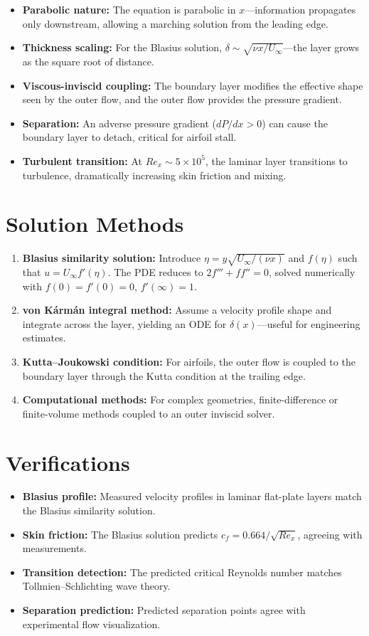 \documentclass[11pt,openright]{book}
\begin{document}
\begin{itemize}
\item \textbf{Parabolic nature:} The equation is parabolic in $x$---information propagates only downstream, allowing a marching solution from the leading edge.
\item \textbf{Thickness scaling:} For the Blasius solution, $\delta \sim \sqrt{\nu x / U_\infty}$---the layer grows as the square root of distance.
\item \textbf{Viscous-inviscid coupling:} The boundary layer modifies the effective shape seen by the outer flow, and the outer flow provides the pressure gradient.
\item \textbf{Separation:} An adverse pressure gradient ($dP/dx > 0$) can cause the boundary layer to detach, critical for airfoil stall.
\item \textbf{Turbulent transition:} At $Re_x \sim 5 \times 10^5$, the laminar layer transitions to turbulence, dramatically increasing skin friction and mixing.
\end{itemize}
\section*{Solution Methods}

\begin{enumerate}
\item \textbf{Blasius similarity solution:} Introduce $\eta = y\sqrt{U_\infty / (\nu x)}$ and $f(\eta)$ such that $u = U_\infty f'(\eta)$. The PDE reduces to $2f''' + f f'' = 0$, solved numerically with $f(0) = f'(0) = 0$, $f'(\infty) = 1$.
\item \textbf{von K\'{a}rm\'{a}n integral method:} Assume a velocity profile shape and integrate across the layer, yielding an ODE for $\delta(x)$---useful for engineering estimates.
\item \textbf{Kutta--Joukowski condition:} For airfoils, the outer flow is coupled to the boundary layer through the Kutta condition at the trailing edge.
\item \textbf{Computational methods:} For complex geometries, finite-difference or finite-volume methods coupled to an outer inviscid solver.
\end{enumerate}
\section*{Verifications}

\begin{itemize}
\item \textbf{Blasius profile:} Measured velocity profiles in laminar flat-plate layers match the Blasius similarity solution.
\item \textbf{Skin friction:} The Blasius solution predicts $c_f = 0.664/\sqrt{Re_x}$, agreeing with measurements.
\item \textbf{Transition detection:} The predicted critical Reynolds number matches Tollmien--Schlichting wave theory.
\item \textbf{Separation prediction:} Predicted separation points agree with experimental flow visualization.
\end{itemize}
\end{document}

